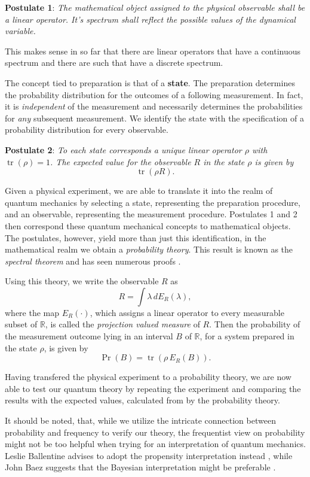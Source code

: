 \documentclass[a4paper]{amsart}            %
\DeclareMathOperator{\tr}{tr}
\theoremstyle{plain}                                               %
\begin{document}
\textbf{Postulate 1}: \itshape The mathematical object assigned to the physical observable shall be a linear operator. It's spectrum shall reflect the possible values of the dynamical variable. \upshape

This makes sense in so far that there are linear operators that have a continuous spectrum and there are such that have a discrete spectrum. 

The concept tied to preparation is that of a \textbf{state}. The preparation determines the probability distribution for the outcomes of a following measurement. In fact, it is \emph{independent} of the measurement and necessarily determines the probabilities for \emph{any} subsequent measurement. We identify the state with the specification of a probability distribution for every observable.

\textbf{Postulate 2}: \itshape To each state corresponds a unique linear operator $\rho$ with $\tr(\rho)=1$. The expected value for the observable $R$ in the state $\rho$ is given by \upshape 
\[\tr(\rho R).\]

Given a physical experiment, we are able to translate it into the realm of quantum mechanics by selecting a state, representing the preparation procedure, and an observable, representing the measurement procedure. Postulates 1 and 2 then correspond these quantum mechanical concepts to mathematical objects. The postulates, however, yield more than just this identification, in the mathematical realm we obtain a \emph{probability theory}. This result is known as the \emph{spectral theorem} and has seen numerous proofs \mbox{\cite{OpAlg,reedsimon}}. 

Using this theory, we write the observable $R$ as \[R=\int \lambda\, dE_R(\lambda),\] where the map $E_R(\cdot)$, which assigns a linear operator to every measurable subset of $\mathbb{R}$, is called the \emph{projection valued measure} of $R$.  Then the probability of the measurement outcome lying in an interval $B$ of $\mathbb{R}$, for a system prepared in the state $\rho$, is given by \[\operatorname{Pr}(B)=\tr(\rho\, E_R(B)).\] 

Having transfered the physical experiment to a probability theory, we are now able to test our quantum theory by repeating the experiment and comparing the results with the expected values, calculated from by the probability theory. 

It should be noted, that, while we utilize the intricate connection between probability and frequency to verify our theory, the frequentist view on probability \cite{stanford} might not be too helpful when trying for an interpretation of quantum mechanics. Leslie Ballentine advises to adopt the propensity interpretation instead \cite[p. 32]{Ballentine_2003}, while John Baez suggests that the Bayesian interpretation might be preferable \cite{Baez}.
\end{document}
